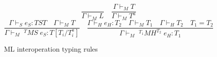\begin{figure}
\[
\frac{}{\Gamma\vdash_{M}L}
\quad
\frac{\Gamma\vdash_{M}T}{\Gamma\vdash_{M}T^{a}}
\]
\bigskip
\[
\frac{\Gamma\vdash_{S}e_{S}:TST\quad\Gamma\vdash_{M}T}{\Gamma\vdash_{M}\;^{T}MS\;e_{S}:T[T_{i}/T^{a}_{i}]}
\quad
\frac{\Gamma\vdash_{H}e_{H}:T_{2}\quad\Gamma\vdash_{M}T_{1}\quad\Gamma\vdash_{H}T_{2}\quad T_{1}=T_{2}}{\Gamma\vdash_{M}\;^{T_{1}}MH^{T_{2}}\;e_{H}:T_{1}}
\]
\caption{ML interoperation typing rules}
\label{mitr}
\end{figure}